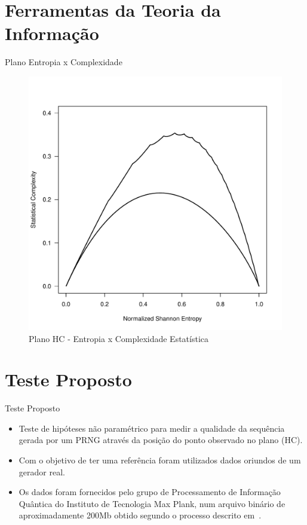 \documentclass[xcolor=dvipsnames]{beamer}
\begin{document}
\section{Ferramentas da Teoria da Informação}
\begin{frame}{Plano Entropia x Complexidade}
      \begin{figure}
      \includegraphics[scale=0.4,center]{plano-HC}
      \caption{Plano HC - Entropia x Complexidade Estatística}
      \end{figure}
\end{frame}

\section{Teste Proposto}
\begin{frame}{Teste Proposto}
    \begin{itemize}
     \item Teste de hipóteses não paramétrico para medir a qualidade da sequência gerada por um PRNG através da posição do ponto observado no plano (HC).
     \pause
     \item Com o objetivo de ter uma referência foram utilizados dados oriundos de um gerador real.
     \pause
     \item Os dados foram fornecidos pelo grupo de Processamento de Informação Quântica do Instituto de Tecnologia Max Plank, num arquivo binário  de aproximadamente 200Mb obtido segundo o processo descrito em~\cite{Gabriel2010}.
    \end{itemize}
\end{frame}
\end{document}
